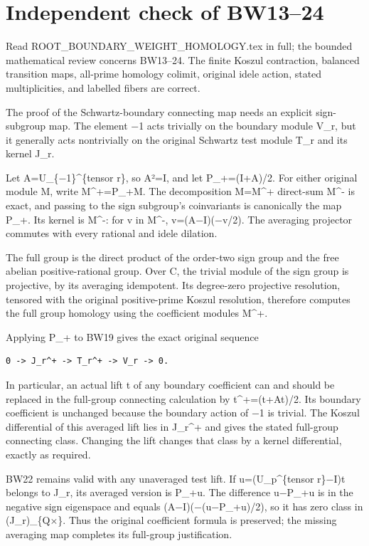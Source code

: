 \documentclass[
]{article}
\author{}
\date{}
\begin{document}
\section{Independent check of
BW13--24}\label{independent-check-of-bw1324}

Read ROOT\_BOUNDARY\_WEIGHT\_HOMOLOGY.tex in full; the bounded
mathematical review concerns BW13--24. The finite Koszul contraction,
balanced transition maps, all-prime homology colimit, original idele
action, stated multiplicities, and labelled fibers are correct.

The proof of the Schwartz-boundary connecting map needs an explicit
sign-subgroup map. The element −1 acts trivially on the boundary module
V\_r, but it generally acts nontrivially on the original Schwartz test
module T\_r and its kernel J\_r.

Let A=U\_\{−1\}\^{}\{tensor r\}, so A²=I, and let P\_+=(I+A)/2. For
either original module M, write M\^{}+=P\_+M. The decomposition M=M\^{}+
direct-sum M\^{}- is exact, and passing to the sign subgroup's
coinvariants is canonically the map P\_+. Its kernel is M\^{}-: for v in
M\^{}-, v=(A−I)(−v/2). The averaging projector commutes with every
rational and idele dilation.

The full group is the direct product of the order-two sign group and the
free abelian positive-rational group. Over C, the trivial module of the
sign group is projective, by its averaging idempotent. Its degree-zero
projective resolution, tensored with the original positive-prime Koszul
resolution, therefore computes the full group homology using the
coefficient modules M\^{}+.

Applying P\_+ to BW19 gives the exact original sequence

\begin{verbatim}
0 -> J_r^+ -> T_r^+ -> V_r -> 0.
\end{verbatim}

In particular, an actual lift t of any boundary coefficient can and
should be replaced in the full-group connecting calculation by
t\^{}+=(t+At)/2. Its boundary coefficient is unchanged because the
boundary action of −1 is trivial. The Koszul differential of this
averaged lift lies in J\_r\^{}+ and gives the stated full-group
connecting class. Changing the lift changes that class by a kernel
differential, exactly as required.

BW22 remains valid with any unaveraged test lift. If u=(U\_p\^{}\{tensor
r\}−I)t belongs to J\_r, its averaged version is P\_+u. The difference
u−P\_+u is in the negative sign eigenspace and equals
(A−I)(−(u−P\_+u)/2), so it has zero class in (J\_r)\_\{Q×\}. Thus the
original coefficient formula is preserved; the missing averaging map
completes its full-group justification.
\end{document}
